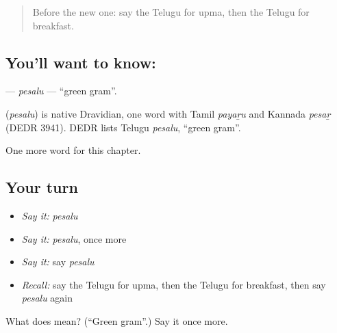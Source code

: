 \label{lesson:TE-C262-pesalu}



\begin{quote}
Before the new one: say the Telugu for upma, then the Telugu for breakfast.
\end{quote}

\subsection*{You'll want to know: }
\textbf{} — \emph{pesalu} — \textquotedblleft{}green gram\textquotedblright{}.

\begin{cousinweb}
\textbf{} (\emph{pesalu}) is native Dravidian, one word with Tamil \emph{payaṟu} and Kannada \emph{pesaṟ} (DEDR 3941). DEDR lists Telugu \emph{pesalu}, \textquotedblleft{}green gram\textquotedblright{}.
\end{cousinweb}

\begin{grammarlens}[title={What you've built}]
One more word for this chapter.
\end{grammarlens}

\subsection*{Your turn}
\begin{itemize}
\raggedright
  \item \emph{Say it:} \emph{pesalu}
  \item \emph{Say it:} \emph{pesalu}, once more
  \item \emph{Say it:} say \emph{pesalu}
  \item \emph{Recall:} say the Telugu for upma, then the Telugu for breakfast, then say \emph{pesalu} again
\end{itemize}

\begin{tcolorbox}[breakable,colback=teal!4,colframe=teal!35!black,title={Before you move on}]
What does  mean? (\textquotedblleft{}Green gram\textquotedblright{}.) Say it once more.
\end{tcolorbox}
